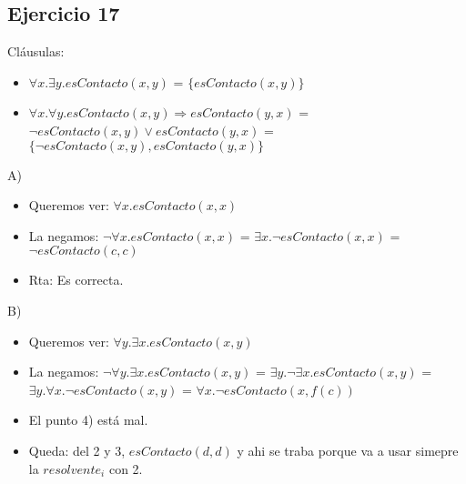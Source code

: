 \documentclass[10pt,a4paper]{article}
\begin{document}
\subsection{Ejercicio 17}
    Cláusulas:
    \begin{itemize}
        \item $\forall x. \exists y. esContacto(x,y)$ = $\{esContacto(x,y)\}$
        \item $\forall x. \forall y. esContacto(x,y) \Rightarrow esContacto(y,x)$ = $\lnot esContacto(x,y) \lor esContacto(y,x)$  = \\ $\{ \lnot esContacto(x,y), esContacto(y,x)\}$
    \end{itemize}
    A) 
    \begin{itemize}
        \item Queremos ver: $\forall x. esContacto(x,x)$ 
        \item La negamos: $\lnot \forall x. esContacto(x,x)$ = $\exists x. \lnot esContacto(x,x)$ = $\lnot esContacto(c,c)$
        \item Rta: Es correcta.
    \end{itemize}
    B) 
    \begin{itemize}
        \item Queremos ver: $\forall y. \exists x. esContacto(x,y)$ 
        \item La negamos: $\lnot \forall y. \exists x. esContacto(x,y)$ = $\exists y. \lnot \exists x. esContacto(x,y)$ = $\exists y. \forall x. \lnot esContacto(x,y)$ = $\forall x. \lnot esContacto(x,f(c))$  
        \item El punto 4) está mal. 
        \item Queda: del 2 y 3, $esContacto(d,d)$ y ahi se traba porque va a usar simepre la $resolvente_{i}$ con 2.
    \end{itemize}
\end{document}
